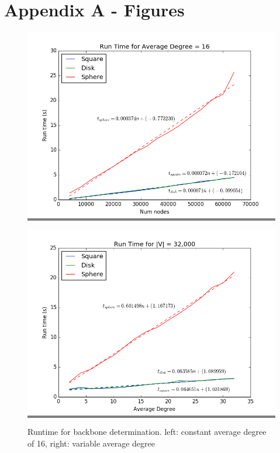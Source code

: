\documentclass{article}
\begin{document}
\newpage

\section{Appendix A - Figures}

\begin{figure}[h]
    \begin{minipage}{0.48\textwidth}
    \colorbox{gray}{\includegraphics[width=\linewidth]{./graphs/run_time_avg_deg_16.png}}
    \end{minipage}
    \hspace{\fill}
    \begin{minipage}{0.48\textwidth}
    \colorbox{gray}{\includegraphics[width=\linewidth]{./graphs/run_time_var_avg_deg.png}}
    \end{minipage}

    \caption{Runtime for backbone determination. left: constant average degree of 16, right: variable average degree}
    \label{runtime}
\end{figure}
\end{document}
